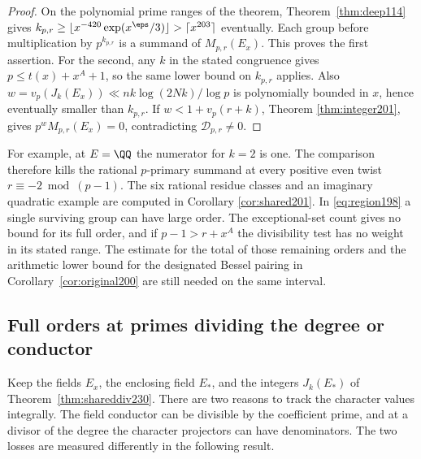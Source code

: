 \documentclass[a4paper,11pt]{article}
\theoremstyle{definition}
\theoremstyle{remark}
\numberwithin{equation}{section}
\begin{document}
\begin{proof}
On the polynomial prime ranges of the theorem,
Theorem~\ref{thm:deep114} gives \(k_{p,r}\ge
\lfloor x^{-420}\allowbreak\exp(x^\eps/3)\rfloor>\lceil x^{203}\rceil\)
eventually. Each group before multiplication by \(p^{k_{p,r}}\)
is a summand of \(M_{p,r}(E_x)\). This proves the first assertion.
For the second, any \(k\) in the stated congruence gives
\(p\le t(x)+x^A+1\), so the same lower bound on \(k_{p,r}\)
applies. Also
\(w=v_p(J_k(E_x))\ll nk\log(2Nk)/\log p\) is polynomially
bounded in \(x\), hence eventually smaller than \(k_{p,r}\).
If \(w<1+v_p(r+k)\), Theorem \ref{thm:integer201}, gives
\(p^wM_{p,r}(E_x)=0\), contradicting \(\mathcal D_{p,r}\ne0\).
\end{proof}

For example, at \(E=\QQ\) the numerator for \(k=2\) is one.
The comparison therefore kills the rational \(p\)-primary
summand at every positive even twist \(r\equiv-2\bmod(p-1)\).
The six rational residue classes and an imaginary quadratic
example are computed in
Corollary \ref{cor:shared201}.
In \eqref{eq:region198} a single surviving group can have large
order. The exceptional-set count gives no bound for its full
order, and if \(p-1>r+x^A\) the divisibility test has no weight
in its stated range. The estimate for the total of those remaining
orders and the arithmetic lower bound for the designated Bessel
pairing in Corollary~\ref{cor:original200} are still needed on
the same interval.

\subsection{Full orders at primes dividing the degree or conductor}\label{nav:II-39}
Keep the fields \(E_x\), the enclosing field \(E_*\), and the integers
\(J_k(E_*)\) of Theorem~\ref{thm:shareddiv230}. There are two reasons
to track the character values integrally. The field conductor can
be divisible by the coefficient prime, and at a divisor of the
degree the character projectors can have denominators. The two
losses are measured differently in the following result.
\end{document}
